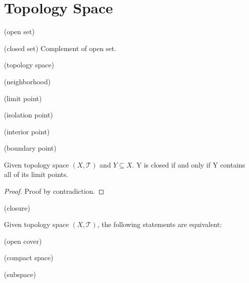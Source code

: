 \chapter{Topology Space}


\begin{definition}
(open set)
\end{definition}

\begin{definition}
(closed set) Complement of open set. 
\end{definition}

\begin{definition}
(topology space)
\end{definition}

\begin{definition}
(neighborhood)
\end{definition}

\begin{definition}
(limit point)
\end{definition}

\begin{definition}
(isolation point)
\end{definition}

\begin{definition}
(interior point)
\end{definition}

\begin{definition}
(boundary point)
\end{definition}

\begin{theorem}
Given topology space $(X, \mathcal{T})$ and $Y \subseteq X$. Y is closed if and only if Y contains all of its limit points. 
\end{theorem}

\begin{proof}
Proof by contradiction. 
\end{proof}

\begin{definition}
(closure)
\end{definition}

\begin{theorem}
Given topology space $(X, \mathcal{T})$, the following statements are equivalent: 
\end{theorem}

\begin{definition}
(open cover)
\end{definition}

\begin{definition}
(compact space)
\end{definition}

\begin{definition}
(subspace)
\end{definition}






